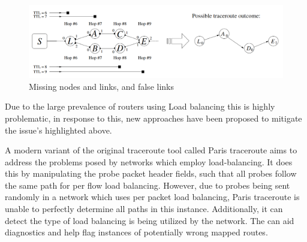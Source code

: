 \begin{figure}[!ht]
  \begin{center}
    \includegraphics[scale=0.3]{images/missing_nodes.png}
    \caption{Missing nodes and links, and false links \cite{anomalies}}
    \label{figure:missing_node_fig}
  \end{center}
\end{figure}



Due to the large prevalence of routers using Load balancing this is highly problematic, in response to this, new approaches have been proposed to mitigate the issue's highlighted above.


A modern variant of the original traceroute tool called Paris traceroute aims to address the problems posed by networks which employ load-balancing. It does this by manipulating the probe packet header fields, such that all probes follow the same path for per flow load balancing. However, due to probes being sent randomly in a network which uses per packet load balancing, Paris traceroute is unable to perfectly determine all paths in this instance. 
Additionally, it can detect the type of load balancing is being utilized by the network. The can aid diagnostics and help flag instances of potentially wrong mapped routes. \cite{anomalies}


